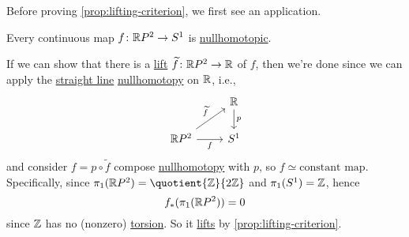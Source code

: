 Before proving \autoref{prop:lifting-criterion}, we first see an application.
\begin{eg}
	Every continuous map \(f\colon \mathbb{\MakeUppercase{r}} P^{2}\to S^1\) is \hyperref[def:nullhomotopic]{nullhomotopic}.
\end{eg}
\begin{explanation}
	If we can show that there is a \hyperref[def:lift]{lift} \(\widetilde{f} \colon \mathbb{\MakeUppercase{r}} P^{2}\to \mathbb{\MakeUppercase{r}}\) of \(f\),
	then we're done since we can apply the \hyperref[eg:lec1:straight-line-homotopy]{straight line} \hyperref[def:nullhomotopic]{nullhomotopy}
	on \(\mathbb{\MakeUppercase{r}} \), i.e.,
	\[
		\begin{tikzcd}
			& {\mathbb{R}} \\
			{\mathbb{R}P^2} & {S^1}
			\arrow["f"', from=2-1, to=2-2]
			\arrow["{\widetilde{f}}", from=2-1, to=1-2]
			\arrow["p", from=1-2, to=2-2]
		\end{tikzcd}
	\]
	and consider \(f = p \circ \widetilde{f} \) compose \hyperref[def:nullhomotopic]{nullhomotopy} with \(p\), so \(f\simeq \text{constant map} \).
	Specifically, since \(\pi _1(\mathbb{\MakeUppercase{r}} P^{2}) = \quotient{\mathbb{\MakeUppercase{z}}}{2 \mathbb{\MakeUppercase{z}}}\) and
	\(\pi _1(S^1) = \mathbb{\MakeUppercase{z}} \), hence
	\[
		f_\ast (\pi _1(\mathbb{\MakeUppercase{r}} P^{2} )) = 0
	\]
	since \(\mathbb{\MakeUppercase{z}} \) has no (nonzero) \hyperref[def:torsion-subgroup]{torsion}. So it \hyperref[prop:homotopy-lifting-property]{lifts} by
	\autoref{prop:lifting-criterion}.
\end{explanation}


